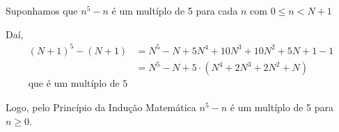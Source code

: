     Suponhamos que $n^5 - n$ é um multíplo de 5 para cada $n$ com $0 \leq n < N+1$

    Daí,
    \begin{align*}
        (N+1)^5 - (N+1) &= N^5 - N + 5N^4 + 10N^3 + 10N^2 + 5N + 1 - 1 \\
        &= N^5 - N + 5 \cdot (N^4 + 2N^3 + 2N^2 + N) \\
        \text{que é um multíplo de 5}
    \end{align*}

    Logo, pelo Princípio da Indução Matemática $n^5 - n$ é um multíplo de 5 para $n \ge 0$. 

    \vspace{2cm}

